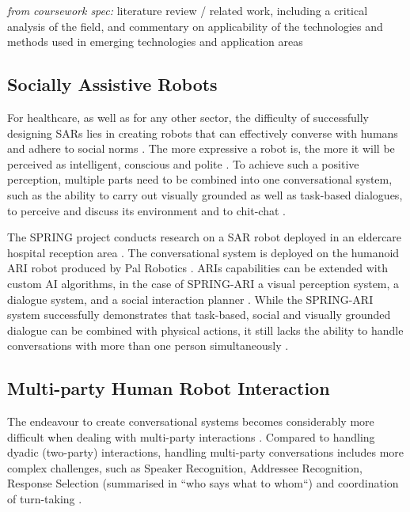 \documentclass[hidelinks, 11pt]{article}
\begin{document}
\textit{from coursework spec:} literature review / related work, including a critical analysis of the field, and commentary on applicability of the technologies and methods used in emerging technologies and application areas

\subsection{Socially Assistive Robots}
\label{subsec:socially_assistive_robots}
For healthcare, as well as for any other sector, the difficulty of successfully designing SARs lies in creating robots that can effectively converse with humans and adhere to social norms \cite{moujahid_multi_party_2022}. The more expressive a robot is, the more it will be perceived as intelligent, conscious and polite \cite{moujahid_multi_party_2022}. To achieve such a positive perception, multiple parts need to be combined into one conversational system, such as the ability to carry out visually grounded as well as task-based dialogues, to perceive and discuss its environment and to chit-chat \cite{gunson_visually_aware_2022}.

The SPRING project conducts research on a SAR robot deployed in an eldercare hospital reception area \cite{addlesee_comprehensive_2020}. The conversational system is deployed on the humanoid ARI robot produced by Pal Robotics \cite{palrobot}. ARIs capabilities can be extended with custom AI algorithms, in the case of SPRING-ARI a visual perception system, a dialogue system, and a social interaction planner \cite{addlesee_comprehensive_2020}. While the SPRING-ARI system successfully demonstrates that task-based, social and visually grounded dialogue can be combined with physical actions, it still lacks the ability to handle conversations with more than one person simultaneously \cite{addlesee_comprehensive_2020}.

\subsection{Multi-party Human Robot Interaction}
\label{subsec:multi_party}
The endeavour to create conversational systems becomes considerably more difficult when dealing with multi-party interactions \cite{Group_1_unpublished_paper}. Compared to handling dyadic (two-party) interactions, handling multi-party conversations includes more complex challenges, such as Speaker Recognition, Addressee Recognition, Response Selection (summarised in “who says what to whom“) and coordination of turn-taking \cite{Group_1_unpublished_paper,Johansson_Skantze_2015}.
\end{document}
